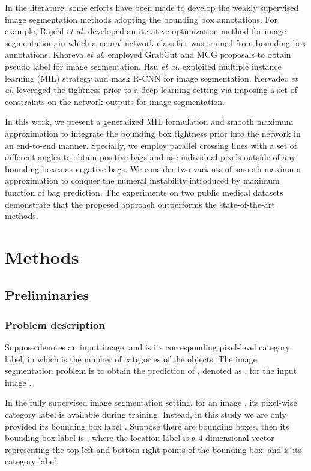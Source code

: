 \documentclass[runningheads]{llncs}
\begin{document}
In the literature, some efforts have been made to develop the weakly supervised image segmentation methods adopting the bounding box annotations. For example, Rajchl \textit{et al.} \cite{rajchl2016deepcut} developed an iterative optimization method for image segmentation, in which a neural network classifier was trained from bounding box annotations. Khoreva \textit{et al.} \cite{khoreva2017simple} employed GrabCut \cite{rother2004grabcut} and MCG proposals \cite{pont2016multiscale} to obtain pseudo label for image segmentation. Hsu \textit{et al.} \cite{hsu2019weakly} exploited multiple instance learning (MIL) strategy and mask R-CNN for image segmentation. Kervadec \textit{et al.} \cite{kervadec2020bounding} leveraged the tightness prior to a deep learning setting via imposing a set of constraints on the network outputs for image segmentation. 

In this work, we present a generalized MIL formulation and smooth maximum approximation to integrate the bounding box tightness prior into the network in an end-to-end manner. Specially, we employ parallel crossing lines with a set of different angles to obtain positive bags and use individual pixels outside of any bounding boxes as negative bags. We consider two variants of smooth maximum approximation to conquer the numeral instability introduced by maximum function of bag prediction.
The experiments on two public medical datasets demonstrate that the proposed approach outperforms the state-of-the-art methods. 

\section{Methods}
\subsection{Preliminaries}

\subsubsection{Problem description}
Suppose  denotes an input image, and  is its corresponding pixel-level category label, in which  is the number of categories of the objects. The image segmentation problem is to obtain the prediction of , denoted as , for the input image . 

In the fully supervised image segmentation setting, for an image , its pixel-wise category label  is available during training. Instead, in this study we are only provided its bounding box label . Suppose there are  bounding boxes, then its bounding box label is , where the location label  is a 4-dimensional vector representing the top left and bottom right points of the bounding box, and  is its category label. 
\end{document}
